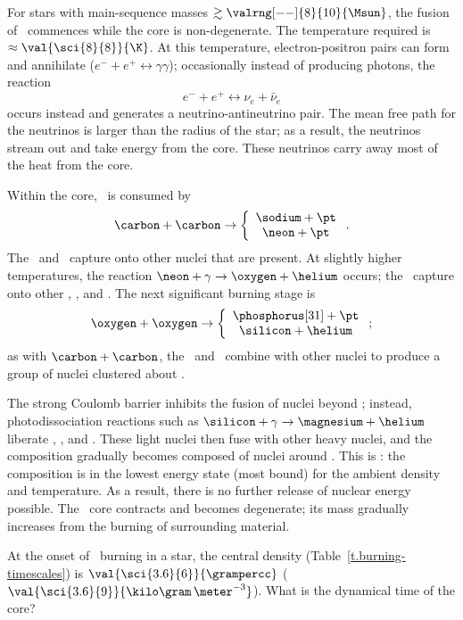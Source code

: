 For stars with main-sequence masses $\gtrsim \valrng[--]{8}{10}{\Msun}$, the fusion of \carbon\ commences while the core is non-degenerate.  The temperature required is $\approx\val{\sci{8}{8}}{\K}$.  At this temperature, electron-positron pairs can form and annihilate ($e^{-}+e^{+}\longleftrightarrow\gamma\gamma$); occasionally instead of producing photons, the reaction
\[ e^{-}+e^{+} \longleftrightarrow \nu_{e} + \bar{\nu}_{e}\]
occurs instead and generates a neutrino-antineutrino pair. The mean free path for the neutrinos is larger than the radius of the star; as a result, the neutrinos stream out and take energy from the core. These neutrinos carry away most of the heat from the core.

Within the core, \carbon\ is consumed by
\[ \carbon+\carbon\to\left\{\begin{array}{c}\sodium+\pt \\\neon+\pt\end{array}\right.. \]
The \pt\ and \helium\ capture onto other nuclei that are present.  At slightly higher temperatures, the reaction $\neon+\gamma \to \oxygen+\helium$ occurs; the \helium\ capture onto other \oxygen, \neon, and \magnesium. The next significant burning stage is
\[\oxygen+\oxygen\to\left\{\begin{array}{c}\phosphorus[31]+\pt \\ \silicon+\helium \end{array}\right. ;\]
as with $\carbon+\carbon$, the \pt\ and \helium\ combine with other nuclei to produce a group of nuclei clustered about \silicon.

The strong Coulomb barrier inhibits the fusion of nuclei beyond \oxygen; instead, photodissociation reactions such as $\silicon+\gamma \to \magnesium+\helium$ liberate \nt, \pt, and \helium.  These light nuclei then fuse with other heavy nuclei, and the composition gradually becomes composed of nuclei around \iron.  This is : the composition is in the lowest energy state (most bound) for the ambient density and temperature. As a result, there is no further release of nuclear energy possible. The \iron\ core contracts and becomes degenerate; its mass gradually increases from the burning of surrounding material.

\begin{exercisebox}
At the onset of \oxygen\ burning in a  star, the central density (Table~\ref{t.burning-timescales}) is $\val{\sci{3.6}{6}}{\grampercc}$ ($\val{\sci{3.6}{9}}{\kilo\gram\,\meter^{-3}}$).  What is the dynamical time of the core?
\end{exercisebox}

